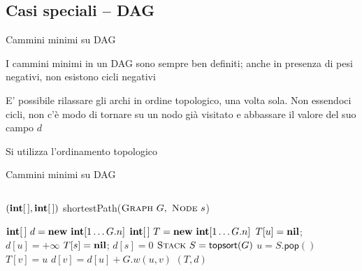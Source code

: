 \subsection{Casi speciali -- DAG}

\begin{frame}{Cammini minimi su DAG}

\vspace{-9pt}
\BIL
\item I cammini minimi in un DAG sono sempre ben definiti; anche in presenza di
pesi negativi, non esistono cicli negativi
\item E' possibile rilassare gli archi in ordine topologico, una volta sola. 
Non essendoci cicli, non c'è modo di tornare su un nodo già visitato e 
abbassare il valore del suo campo $d$
\EIL

\BIL
\item Si utilizza l'ordinamento topologico
\EIL

\end{frame}

\begin{frame}{Cammini minimi su DAG}

\vspace{-24pt}
\begin{columns}
\begin{Procedure}
\caption[A]{$(\INTEGER[\,], \INTEGER[\,])$ \textsf{shortestPath}($\textsc{Graph}\ G,\ \textsc{Node}\ s$)}
$\INTEGER[\,]\ d = \NEW\ \INTEGER[1 \mldots G.n]$
$\INTEGER[\,]\ T = \NEW\ \INTEGER[1 \mldots G.n]$
{
  $T[u] = \textbf{nil}$; $d[u] = +\infty$\; 
}
$T[s] = \textbf{nil}$; $d[s] = 0$\; 
$\textsc{Stack}\ S = \textsf{topsort}(G)$\;
{
  $u = S.\textsf{pop}()$\;
  {
    {
      $T[v] = u$\;
      $d[v] = d[u] + G.w(u,v)$\;
    }
  }
}
\Return $(T,d)$
\end{Procedure}
\end{columns}

\end{frame}

